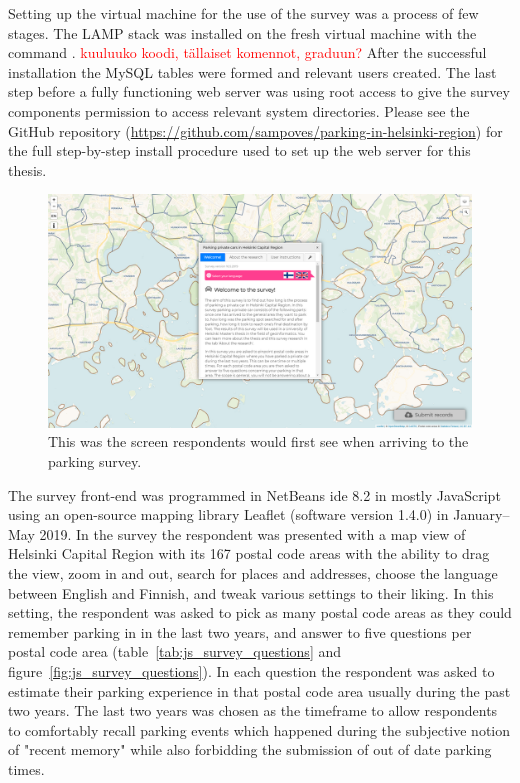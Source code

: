 Setting up the virtual machine for the use of the survey was a process of few stages. The LAMP stack was installed on the fresh virtual machine with the command . \textcolor{red}{kuuluuko koodi, tällaiset komennot, graduun?} After the successful installation the MySQL tables were formed and relevant users created. The last step before a fully functioning web server was using root access to give the survey components permission to access relevant system directories. Please see the GitHub repository (\textcolor{blue}{\url{https://github.com/sampoves/parking-in-helsinki-region}}) for the full step-by-step install procedure used to set up the web server for this thesis.

\begin{figure}[H]%
    \includegraphics[width=\textwidth]{images/js_survey_welcome.png}
    \caption[Survey landing page]{This was the screen respondents would first see when arriving to the parking survey.}%
    \label{fig:js_survey_welcome}%
\end{figure}

The survey front-end was programmed in NetBeans \gls{ide} 8.2 in mostly JavaScript using an open-source mapping library Leaflet (software version 1.4.0) in January--May 2019. In the survey the respondent was presented with a map view of Helsinki Capital Region with its 167 postal code areas with the ability to drag the view, zoom in and out, search for places and addresses, choose the language between English and Finnish, and tweak various settings to their liking. In this setting, the respondent was asked to pick as many postal code areas as they could remember parking in in the last two years, and answer to five questions per postal code area (table~\ref{tab:js_survey_questions} and figure~\ref{fig:js_survey_questions}). In each question the respondent was asked to estimate their parking experience in that postal code area usually during the past two years. The last two years was chosen as the timeframe to allow respondents to comfortably recall parking events which happened during the subjective notion of "recent memory" while also forbidding the submission of out of date parking times. 

